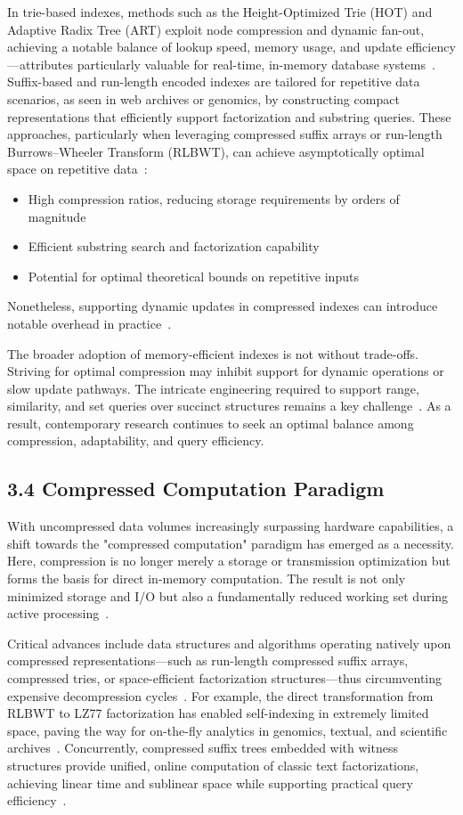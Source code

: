 \documentclass[11pt]{article}
\begin{document}
In trie-based indexes, methods such as the Height-Optimized Trie (HOT) and Adaptive Radix Tree (ART) exploit node compression and dynamic fan-out, achieving a notable balance of lookup speed, memory usage, and update efficiency—attributes particularly valuable for real-time, in-memory database systems~\cite{87,106,109}. Suffix-based and run-length encoded indexes are tailored for repetitive data scenarios, as seen in web archives or genomics, by constructing compact representations that efficiently support factorization and substring queries. These approaches, particularly when leveraging compressed suffix arrays or run-length Burrows–Wheeler Transform (RLBWT), can achieve asymptotically optimal space on repetitive data~\cite{108}:
\begin{itemize}
    \item High compression ratios, reducing storage requirements by orders of magnitude
    \item Efficient substring search and factorization capability
    \item Potential for optimal theoretical bounds on repetitive inputs
\end{itemize}
Nonetheless, supporting dynamic updates in compressed indexes can introduce notable overhead in practice~\cite{108,118}.

The broader adoption of memory-efficient indexes is not without trade-offs. Striving for optimal compression may inhibit support for dynamic operations or slow update pathways. The intricate engineering required to support range, similarity, and set queries over succinct structures remains a key challenge~\cite{109,118}. As a result, contemporary research continues to seek an optimal balance among compression, adaptability, and query efficiency.

\subsection{3.4 Compressed Computation Paradigm}

With uncompressed data volumes increasingly surpassing hardware capabilities, a shift towards the "compressed computation" paradigm has emerged as a necessity. Here, compression is no longer merely a storage or transmission optimization but forms the basis for direct in-memory computation. The result is not only minimized storage and I/O but also a fundamentally reduced working set during active processing~\cite{118}. 

Critical advances include data structures and algorithms operating natively upon compressed representations—such as run-length compressed suffix arrays, compressed tries, or space-efficient factorization structures—thus circumventing expensive decompression cycles~\cite{80,81,82,87,106,108,109,118}. For example, the direct transformation from RLBWT to LZ77 factorization has enabled self-indexing in extremely limited space, paving the way for on-the-fly analytics in genomics, textual, and scientific archives~\cite{108}. Concurrently, compressed suffix trees embedded with witness structures provide unified, online computation of classic text factorizations, achieving linear time and sublinear space while supporting practical query efficiency~\cite{109}.
\end{document}

